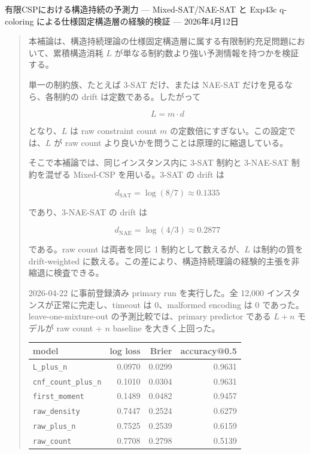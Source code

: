 \documentclass[12pt,a4paper]{article}
\begin{document}
\PaperTitleBlock
  {有限CSPにおける構造持続の予測力}
  {— Mixed-SAT/NAE-SAT と Exp43c q-coloring による仕様固定構造層の経験的検証 —}
  {2026年4月12日}

\begin{abstract}
本補論は、構造持続理論の仕様固定構造層に属する有限制約充足問題において、累積構造消耗 \(L\) が単なる制約数より強い予測情報を持つかを検証する。

単一の制約族、たとえば 3-SAT だけ、または NAE-SAT だけを見るなら、各制約の drift は定数である。したがって

\[
L = m \cdot d
\]

となり、\(L\) は raw constraint count \(m\) の定数倍にすぎない。この設定では、\(L\) が raw count より良いかを問うことは原理的に縮退している。

そこで本補論では、同じインスタンス内に 3-SAT 制約と 3-NAE-SAT 制約を混ぜる Mixed-CSP を用いる。3-SAT の drift は

\[
d_{\mathrm{SAT}}=\log(8/7)\approx 0.1335
\]

であり、3-NAE-SAT の drift は

\[
d_{\mathrm{NAE}}=\log(4/3)\approx 0.2877
\]

である。raw count は両者を同じ 1 制約として数えるが、\(L\) は制約の質を drift-weighted に数える。この差により、構造持続理論の経験的主張を非縮退に検査できる。

2026-04-22 に事前登録済み primary run を実行した。全 12,000 インスタンスが正常に完走し、timeout は 0、malformed encoding は 0 であった。leave-one-mixture-out の予測比較では、primary predictor である \(L+n\) モデルが raw count + \(n\) baseline を大きく上回った。

{\def\LTcaptype{table} %
\begin{longtable}[]{@{}lrrr@{}}
\toprule\noalign{}
model & log loss & Brier & accuracy@0.5 \\
\midrule\noalign{}
\endhead
\bottomrule\noalign{}
\endlastfoot
\texttt{L\_plus\_n} & 0.0970 & 0.0299 & 0.9631 \\
\texttt{cnf\_count\_plus\_n} & 0.1010 & 0.0304 & 0.9631 \\
\texttt{first\_moment} & 0.1489 & 0.0482 & 0.9457 \\
\texttt{raw\_density} & 0.7447 & 0.2524 & 0.6279 \\
\texttt{raw\_plus\_n} & 0.7525 & 0.2539 & 0.6159 \\
\texttt{raw\_count} & 0.7708 & 0.2798 & 0.5139 \\
\end{longtable}
}


\end{abstract}
\end{document}
